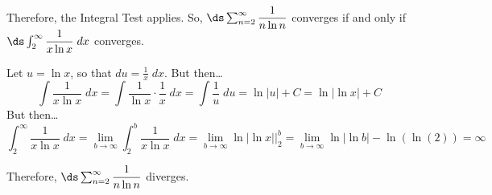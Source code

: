 \documentclass[12pt,letterpaper]{exam}
\begin{document}
\begin{questions}
{Therefore, the Integral Test applies. So, $\ds\sum_{n=2}^\infty \dfrac{1}{n \ln n}$ converges if and only if $\ds\int_2^\infty \dfrac{1}{x \ln x} \;dx$ converges. \par\vspace{0.3cm}

Let $u= \ln x$, so that $du= \frac{1}{x}\;dx$. But then\dots
	\[
	\int \dfrac{1}{x \ln x} \;dx= \int \dfrac{1}{\ln x} \cdot \dfrac{1}{x} \;dx= \int \dfrac{1}{u} \;du= \ln|u| + C= \ln|\ln x| + C
	\]
But then\dots
	\[
	\int_2^\infty \dfrac{1}{x \ln x} \;dx= \lim_{b \to \infty} \int_2^b \dfrac{1}{x \ln x} \;dx= \lim_{b \to \infty}  \ln|\ln x| \bigg|_2^b= \lim_{b \to \infty} \ln| \ln b | - \ln(\ln(2))= \infty
	\] \par\vspace{0.3cm}
Therefore, $\ds\sum_{n=2}^\infty \dfrac{1}{n \ln n}$ diverges.}

\end{questions}
\end{document}
